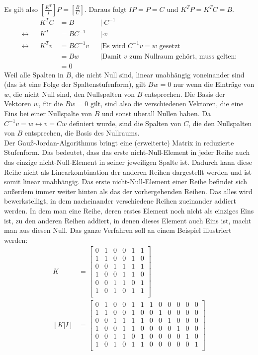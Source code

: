 \documentclass[a4paper,10pt,ngerman]{scrartcl}
\begin{document}
Es gilt also $\left[\frac{K^T}{I}\right] P = \left[\frac{B}{C}\right]$. Daraus folgt $I P = P = C$ und $K^T P = K^T C = B$.
\begin{align*}
&& K^T C &= B  &&|\cdot C^{-1}\\
\leftrightarrow && K^T &= BC^{-1} &&|\cdot v \\
\leftrightarrow && K^T v &= BC^{-1} v && | \text{Es wird $C^{-1}v = w$ gesetzt}\\
&& &= Bw && | \text{Damit $v$ zum Nullraum gehört, muss gelten:}\\
&& &= 0 
\end{align*}
Weil alle Spalten in $B$, die nicht Null sind, linear unabhängig voneinander sind (das ist eine Folge der Spaltenstufenform), gilt $Bw=0$ nur wenn die Einträge von $w$, die nicht Null sind, den Nullspalten von $B$ entsprechen. Die Basis der Vektoren $w$, für die $Bw=0$ gilt, sind also die verschiedenen Vektoren, die eine Eins bei einer Nullspalte von $B$ und sonst überall Nullen haben. Da $C^{-1} v = w \leftrightarrow v = C w$ definiert wurde, sind die Spalten von $C$, die den Nullspalten von $B$ entsprechen, die Basis des Nullraums. \\
Der Gauß-Jordan-Algorithmus bringt eine (erweiterte) Matrix in reduzierte Stufenform. Das bedeutet, dass das erste nicht-Null-Element in jeder Reihe auch das einzige nicht-Null-Element in seiner jeweiligen Spalte ist. Dadurch kann diese Reihe nicht als Linearkombination der anderen Reihen dargestellt werden und ist somit linear unabhängig. Das erste nicht-Null-Element einer Reihe befindet sich außerdem immer weiter hinten als das der vorhergehenden Reihen. Das alles wird bewerkstelligt, in dem nacheinander verschiedene Reihen zueinander addiert werden. In dem man eine Reihe, deren erstes Element noch nicht als einziges Eins ist, zu den anderen Reihen addiert, in denen dieses Element auch Eins ist, macht man aus diesen Null. 
Das ganze Verfahren soll an einem Beispiel illustriert werden:
\begin{align*}
K &= \left[ \begin{array}{cccccc}
0 & 1 & 0 & 0 & 1 & 1 \\
1 & 1 & 0 & 0 & 1 & 0 \\
0 & 0 & 1 & 1 & 1 & 1 \\
1 & 0 & 0 & 1 & 1 & 0 \\
0 & 0 & 1 & 1 & 0 & 1 \\
1 & 0 & 1 & 0 & 1 & 1 \\
\end{array} \right] \\
[K | I] &= \left[ \begin{array}{cccccc|cccccc}
0 & 1 & 0 & 0 & 1 & 1 & 1 & 0 & 0 & 0 & 0 & 0 \\
1 & 1 & 0 & 0 & 1 & 0 & 0 & 1 & 0 & 0 & 0 & 0 \\
0 & 0 & 1 & 1 & 1 & 1 & 0 & 0 & 1 & 0 & 0 & 0 \\
1 & 0 & 0 & 1 & 1 & 0 & 0 & 0 & 0 & 1 & 0 & 0 \\
0 & 0 & 1 & 1 & 0 & 1 & 0 & 0 & 0 & 0 & 1 & 0 \\
1 & 0 & 1 & 0 & 1 & 1 & 0 & 0 & 0 & 0 & 0 & 1 \\
\end{array} \right]
\end{align*} 
\end{document}
